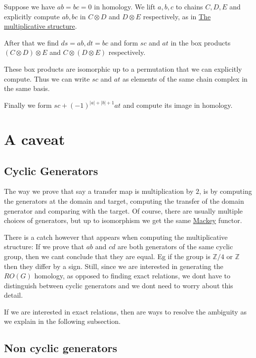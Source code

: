 \begin{DoxyItemize}
\item Suppose we have $ab=bc=0$ in homology. We lift $a,b,c$ to chains $C,D,E$ and explicitly compute $ab, bc$ in $C\otimes D$ and $D\otimes E$ respectively, as in \hyperlink{math_mult}{The multiplicative structure}.
\item After that we find $ds=ab, dt=bc$ and form $sc$ and $at$ in the box products $(C\otimes D) \otimes E$ and $C\otimes (D\otimes E)$ respectively.
\item These box products are isomorphic up to a permutation that we can explicitly compute. Thus we can write $sc$ and $at$ as elements of the same chain complex in the same basis.
\item Finally we form $sc+(-1)^{|a|+|b|+1}at$ and compute its image in homology.
\end{DoxyItemize}\hypertarget{math_caveat}{}\section{A caveat}\label{math_caveat}
\hypertarget{math_cyclic}{}\subsection{Cyclic Generators}\label{math_cyclic}

\begin{DoxyItemize}
\item The way we prove that say a transfer map is multiplication by $2$, is by computing the generators at the domain and target, computing the transfer of the domain generator and comparing with the target. Of course, there are usually multiple choices of generators, but up to isomorphism we get the same \hyperlink{namespaceMackey}{Mackey} functor.
\item There is a catch however that appears when computing the multiplicative structure\+: If we prove that $ab$ and $cd$ are both generators of the same cyclic group, then we can\textquotesingle{}t conclude that they are equal. Eg if the group is $\mathbb Z/4$ or $\mathbb Z$ then they differ by a sign. Still, since we are interested in generating the $RO(G)$ homology, as opposed to finding exact relations, we don\textquotesingle{}t have to distinguish between cyclic generators and we don\textquotesingle{}t need to worry about this detail.
\item If we are interested in exact relations, then are ways to resolve the ambiguity as we explain in the following subsection.
\end{DoxyItemize}\hypertarget{math_noncycl}{}\subsection{Non cyclic generators}\label{math_noncycl}


